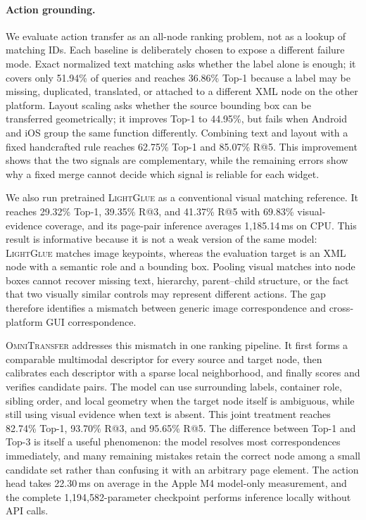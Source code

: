 \paragraph{Action grounding.}
We evaluate action transfer as an all-node ranking problem, not as a lookup of
matching IDs.  Each baseline is deliberately chosen to expose a different
failure mode.  Exact normalized text matching asks whether the label alone is
enough; it covers only 51.94\% of queries and reaches 36.86\% Top-1 because a
label may be missing, duplicated, translated, or attached to a different XML
node on the other platform.  Layout scaling asks whether the source bounding
box can be transferred geometrically; it improves Top-1 to 44.95\%, but fails
when Android and iOS group the same function differently.  Combining text and
layout with a fixed handcrafted rule reaches 62.75\% Top-1 and 85.07\% R@5.
This improvement shows that the two signals are complementary, while the
remaining errors show why a fixed merge cannot decide which signal is reliable
for each widget.

We also run pretrained \textsc{LightGlue} as a conventional visual matching
reference.  It reaches 29.32\% Top-1, 39.35\% R@3, and 41.37\% R@5 with
69.83\% visual-evidence coverage, and its page-pair inference averages
1,185.14\,ms on CPU.  This result is informative because it is not a weak
version of the same model: \textsc{LightGlue} matches image keypoints, whereas
the evaluation target is an XML node with a semantic role and a bounding box.
Pooling visual matches into node boxes cannot recover missing text, hierarchy,
parent--child structure, or the fact that two visually similar controls may
represent different actions.  The gap therefore identifies a mismatch between
generic image correspondence and cross-platform GUI correspondence.

\textsc{OmniTransfer} addresses this mismatch in one ranking pipeline.  It first
forms a comparable multimodal descriptor for every source and target node,
then calibrates each descriptor with a sparse local neighborhood, and finally
scores and verifies candidate pairs.  The model can use surrounding labels,
container role, sibling order, and local geometry when the target node itself
is ambiguous, while still using visual evidence when text is absent.  This
joint treatment reaches 82.74\% Top-1, 93.70\% R@3, and 95.65\% R@5.  The
difference between Top-1 and Top-3 is itself a useful phenomenon: the model
resolves most correspondences immediately, and many remaining mistakes retain
the correct node among a small candidate set rather than confusing it with an
arbitrary page element.  The action head takes 22.30\,ms on average in the
Apple M4 model-only measurement, and the complete 1,194,582-parameter
checkpoint performs inference locally without API calls.


